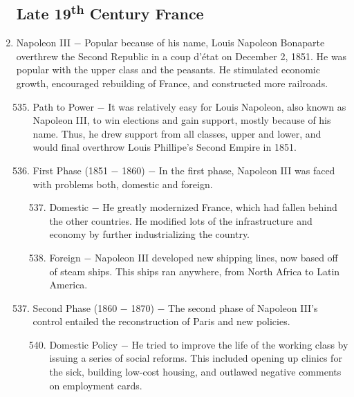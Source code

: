\documentclass[12pt]{article}
\begin{document}
\begin{enumerate}
\subsection{Late 19\textsuperscript{th} Century France}

\item Napoleon III $-$ Popular because of his name, Louis Napoleon Bonaparte overthrew the Second Republic in a coup d'\'etat on December 2, 1851. He was popular with the upper class and the peasants. He stimulated economic growth, encouraged rebuilding of France, and constructed more railroads.

\begin{enumerate}[label=\arabic{*}.]
\setcounter{enumii}{534}

\item Path to Power $-$ It was relatively easy for Louis Napoleon, also known as Napoleon III, to win elections and gain support, mostly because of his name. Thus, he drew support from all classes, upper and lower, and would final overthrow Louis Phillipe's Second Empire in 1851.

\item First Phase (1851 $-$ 1860) $-$ In the first phase, Napoleon III was faced with problems both, domestic and foreign.

\begin{enumerate}[label=\arabic{*}.]
\setcounter{enumiii}{536}

\item Domestic $-$ He greatly modernized France, which had fallen behind the other countries. He modified lots of the infrastructure and economy by further industrializing the country.

\item Foreign $-$ Napoleon III developed new shipping lines, now based off of steam ships. This ships ran anywhere, from North Africa to Latin America.

\end{enumerate}
\setcounter{enumii}{538}

\item Second Phase (1860 $-$ 1870) $-$ The second phase of Napoleon III's control entailed the reconstruction of Paris and new policies.

\begin{enumerate}[label=\arabic{*}.]
\setcounter{enumiii}{539}

\item Domestic Policy $-$ He tried to improve the life of the working class by issuing a series of social reforms. This included opening up clinics for the sick, building low-cost housing, and outlawed negative comments on employment cards. 


\end{enumerate}
\end{enumerate}
\end{enumerate}
\end{document}
